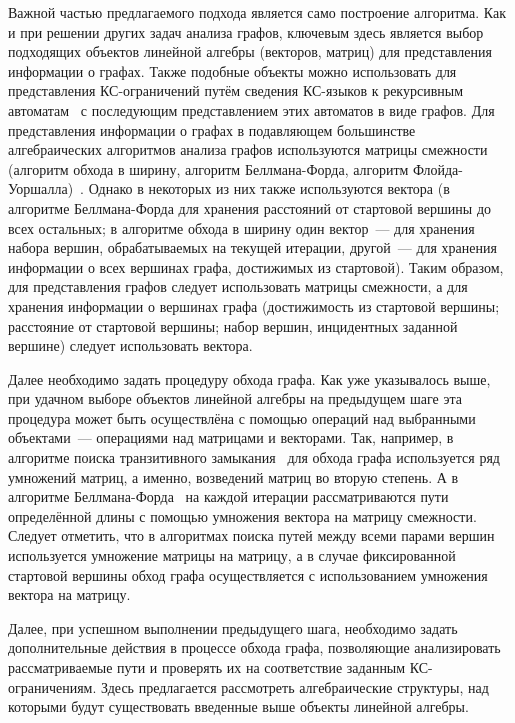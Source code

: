 Важной частью предлагаемого подхода является само построение алгоритма. Как и при решении других задач анализа графов, ключевым здесь является выбор подходящих объектов линейной алгебры (векторов, матриц) для представления информации о графах. Также подобные объекты можно использовать для представления КС-ограничений путём сведения КС-языков к рекурсивным автоматам~\cite{alur2005analysis} с последующим представлением этих автоматов в виде графов. Для представления информации о графах в подавляющем большинстве алгебраических алгоритмов анализа графов используются матрицы смежности (алгоритм обхода в ширину, алгоритм Беллмана-Форда, алгоритм Флойда-Уоршалла)~\cite{kepner2011graph}. Однако в некоторых из них также используются вектора (в алгоритме Беллмана-Форда для хранения расстояний от стартовой вершины до всех остальных; в алгоритме обхода в ширину один вектор~--- для хранения набора вершин, обрабатываемых на текущей итерации, другой~--- для хранения информации о всех вершинах графа, достижимых из стартовой). Таким образом, для представления графов следует использовать матрицы смежности, а для хранения информации о вершинах графа (достижимость из стартовой вершины; расстояние от стартовой вершины; набор вершин, инцидентных заданной вершине) следует использовать вектора.


Далее необходимо задать процедуру обхода графа. Как уже указывалось выше, при удачном выборе объектов линейной алгебры на предыдущем шаге  эта процедура может быть осуществлёна с помощью  операций над выбранными объектами~--- операциями над матрицами и векторами. Так, например, в алгоритме поиска транзитивного замыкания~\cite{baras2010path} для обхода графа используется ряд умножений матриц, а именно, возведений матриц во вторую степень. А в алгоритме Беллмана-Форда~\cite{kepner2011graph} на каждой итерации рассматриваются пути определённой длины с помощью умножения вектора на матрицу смежности. Следует отметить, что в алгоритмах поиска путей между всеми парами вершин используется умножение матрицы на матрицу, а в случае фиксированной стартовой вершины обход графа осуществляется с использованием умножения вектора на матрицу.


Далее, при успешном выполнении предыдущего шага, необходимо задать дополнительные действия в процессе обхода графа, позволяющие анализировать рассматриваемые пути и проверять их на соответствие заданным КС-ограничениям. Здесь предлагается рассмотреть алгебраические структуры, над которыми будут существовать введенные выше объекты линейной алгебры.  


